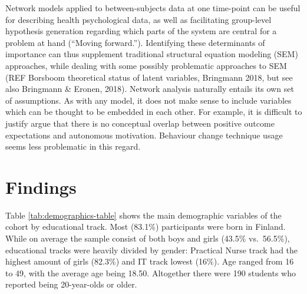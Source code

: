 \documentclass[english,floatsintext,]{apa6}
\theoremstyle{definition}
\theoremstyle{definition}
\theoremstyle{definition}
\theoremstyle{remark}
\begin{document}
Network models applied to between-subjects data at one time-point can be
useful for describing health psychological data, as well as facilitating
group-level hypothesis generation regarding which parts of the system
are central for a problem at hand (\enquote{Moving forward.}).
Identifying these determinants of importance can thus supplement
traditional structural equation modeling (SEM) approaches, while dealing
with some possibly problematic approaches to SEM (REF Borsboom
theoretical status of latent variables, Bringmann 2018, but see also
Bringmann \& Eronen, 2018). Network analysis naturally entails its own
set of assumptions. As with any model, it does not make sense to include
variables which can be thought to be embedded in each other. For
example, it is difficult to justify argue that there is no conceptual
overlap between positive outcome expectations and autonomous motivation.
Behaviour change technique usage seems less problematic in this regard.

\section{Findings}\label{findings}

Table \ref{tab:demographics-table} shows the main demographic variables
of the cohort by educational track. Most (83.1\%) participants were born
in Finland. While on average the sample consist of both boys and girls
(43.5\% vs.~56.5\%), educational tracks were heavily divided by gender:
Practical Nurse track had the highest amount of girls (82.3\%) and IT
track lowest (16\%). Age ranged from 16 to 49, with the average age
being 18.50. Altogether there were 190 students who reported being
20-year-olds or older.
\end{document}
